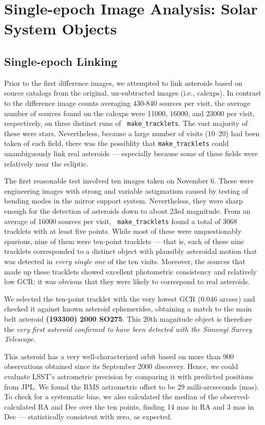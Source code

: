 \section{Single-epoch Image Analysis: Solar System Objects}
\label{sec:sia_solar_system}

\subsection{Single-epoch Linking}
\label{sec:linking}

Prior to the first difference images, we attempted to link asteroids based
on source catalogs from the original, un-subtracted images (i.e., calexps). 
In contrast to the difference image counts averaging 430-840 sources per
visit, the average number of sources found on the calexps were 11000, 16000,
and 23000 per visit, respectively, on three distinct runs of {\tt
make\_tracklets}.  The vast majority of these were stars.  Nevertheless,
because a large number of visits (10--20) had been taken of each field,
there was the possiblity that {\tt make\_tracklets} could unambiguously link
real asteroids --- especially because some of these fields were relatively
near the ecliptic.

The first reasonable test involved ten images taken on November 6.  These
were engineering images with strong and variable astigmatism caused by
testing of bending modes in the mirror support system.  Nevertheless, they
were sharp enough for the detection of asteroids down to about 23rd
magnitude.  From an average of 16000 sources per visit, {\tt
make\_tracklets} found a total of 3068 tracklets with at least five points. 
While most of these were unquestionably spurious, nine of them were
ten-point tracklets --- that is, each of these nine tracklets corresponded
to a distinct object with plausibly asteroidal motion that was detected in
{\em every single one} of the ten visits.  Moreover, the sources that made
up these tracklets showed excellent photometric consistency and relatively
low GCR: it was obvious that they were likely to correspond to real
asteroids.

We selected the ten-point tracklet with the very lowest GCR (0.046 arcsec)
and checked it against known asteroid ephemerides, obtaining a match to the
main belt asteroid \textbf{(193300) 2000 SO275}.  This 20th magnitude object
is therefore the {\em very first asteroid confirmed to have been detected
with the Simonyi Survey Telescope.}

This asteroid has a very well-characterized orbit based on more than 900
observations obtained since its September 2000 discovery.  Hence, we could
evaluate LSST's astrometric precision by comparing it with predicted
positions from JPL.  We found the RMS astrometric offset to be 29
milli-arcseconds (mas).  To check for a systematic bias, we also calculated
the median of the observed-calculated RA and Dec over the ten points,
finding 14 mas in RA and 3 mas in Dec --- statistically consistent with
zero, as expected.

